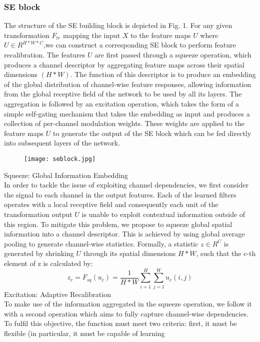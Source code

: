 \subsubsection{SE block}
The structure of the SE building block is depicted in Fig. 1. For any given transformation $F_{tr}$ mapping the input $X$ to the feature maps $U$ where $U \in R^{H*W*C}$,we can construct a corresponding SE block to perform feature recalibration. The features $U$ are first passed through a squeeze operation, which produces a channel descriptor by aggregating feature maps across their spatial dimensions $(H*W)$. The function of this descriptor is to produce an embedding of the global distribution of channel-wise feature responses, allowing information from the global receptive field of the network to be used by
all its layers. The aggregation is followed by an excitation operation, which takes the form of a simple self-gating mechanism that takes the embedding as input and produces a collection of per-channel modulation weights. These weights are applied to the feature maps $U$ to generate the output of the SE block which can be fed directly into subsequent layers of the network.\\
\begin{figure}[H]
	\centering
	\texttt{[image: seblock.jpg]}
\end{figure}
Squeeze: Global Information Embedding\\
In order to tackle the issue of exploiting channel dependencies, we first consider the signal to each channel in the output features. Each of the learned filters operates with a local receptive field and consequently each unit of the transformation output $U$ is unable to exploit contextual
information outside of this region. To mitigate this problem, we propose to squeeze global spatial information into a channel descriptor. This is
achieved by using global average pooling to generate channel-wise statistics. Formally, a statistic $z \in R^C$ is generated by shrinking $U$ through its spatial dimensions $H*W$, such that the c-th element of z is calculated by:
\begin{equation}
z_c=F_{sq}(u_c)=\frac{1}{H*W}\sum_{i=1}^H\sum_{j=1}^Wu_c(i,j)
\end{equation}
Excitation: Adaptive Recalibration\\
To make use of the information aggregated in the squeeze operation, we follow it with a second operation which aims to fully capture channel-wise dependencies. To fulfil this objective, the function must meet two criteria: first, it must be flexible (in particular, it must be capable of learning
